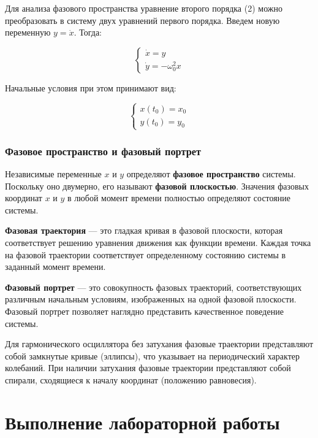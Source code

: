 \documentclass[
  12pt,
  a4paper,
  DIV=11,
  numbers=noendperiod]{scrreprt}
\begin{document}
Для анализа фазового пространства уравнение второго порядка (2) можно
преобразовать в систему двух уравнений первого порядка. Введем новую
переменную \(y = \dot{x}\). Тогда:

\[
\begin{cases}
\dot{x} = y \\
\dot{y} = -\omega_0^2 x
\end{cases} \tag{4}
\]

Начальные условия при этом принимают вид:

\[
\begin{cases}
x(t_0) = x_0 \\
y(t_0) = y_0
\end{cases} \tag{5}
\]

\subsection{Фазовое пространство и фазовый
портрет}\label{ux444ux430ux437ux43eux432ux43eux435-ux43fux440ux43eux441ux442ux440ux430ux43dux441ux442ux432ux43e-ux438-ux444ux430ux437ux43eux432ux44bux439-ux43fux43eux440ux442ux440ux435ux442}

Независимые переменные \(x\) и \(y\) определяют \textbf{фазовое
пространство} системы. Поскольку оно двумерно, его называют
\textbf{фазовой плоскостью}. Значения фазовых координат \(x\) и \(y\) в
любой момент времени полностью определяют состояние системы.

\textbf{Фазовая траектория} --- это гладкая кривая в фазовой плоскости,
которая соответствует решению уравнения движения как функции времени.
Каждая точка на фазовой траектории соответствует определенному состоянию
системы в заданный момент времени.

\textbf{Фазовый портрет} --- это совокупность фазовых траекторий,
соответствующих различным начальным условиям, изображенных на одной
фазовой плоскости. Фазовый портрет позволяет наглядно представить
качественное поведение системы.

Для гармонического осциллятора без затухания фазовые траектории
представляют собой замкнутые кривые (эллипсы), что указывает на
периодический характер колебаний. При наличии затухания фазовые
траектории представляют собой спирали, сходящиеся к началу координат
(положению равновесия).

\chapter{Выполнение лабораторной
работы}\label{ux432ux44bux43fux43eux43bux43dux435ux43dux438ux435-ux43bux430ux431ux43eux440ux430ux442ux43eux440ux43dux43eux439-ux440ux430ux431ux43eux442ux44b}
\end{document}
